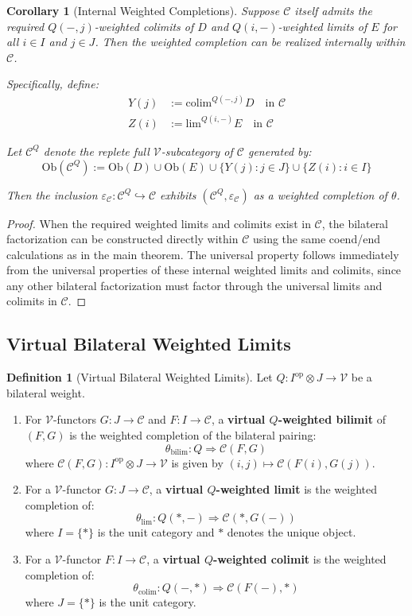 \documentclass[11pt]{article}
\theoremstyle{plain}
\newtheorem{corollary}[theorem]{Corollary}
\theoremstyle{definition}
\newtheorem{definition}[theorem]{Definition}
\theoremstyle{remark}
\newcommand{\V}{\mathcal{V}}
\newcommand{\C}{\mathcal{C}}
\newcommand{\op}{\mathrm{op}}
\newcommand{\colim}{\mathrm{colim}}
\renewcommand{\lim}{\mathrm{lim}}
\begin{document}
\begin{corollary}[Internal Weighted Completions]\label{cor:internal-weighted completion}
Suppose $\C$ itself admits the required $Q(-, j)$-weighted colimits of $D$ and $Q(i, -)$-weighted limits of $E$ for all $i \in I$ and $j \in J$. Then the weighted completion can be realized internally within $\C$.

Specifically, define:
\begin{align}
Y(j) &:= \colim^{Q(-, j)} D \quad \text{in } \C \\
Z(i) &:= \lim^{Q(i, -)} E \quad \text{in } \C
\end{align}

Let $\C^Q$ denote the replete full $\V$-subcategory of $\C$ generated by:
$$\mathrm{Ob}(\C^Q) := \mathrm{Ob}(D) \cup \mathrm{Ob}(E) \cup \{Y(j) : j \in J\} \cup \{Z(i) : i \in I\}$$

Then the inclusion $\varepsilon_\C : \C^Q \hookrightarrow \C$ exhibits $(\C^Q, \varepsilon_\C)$ as a weighted completion of $\theta$.
\end{corollary}

\begin{proof}
When the required weighted limits and colimits exist in $\C$, the bilateral factorization can be constructed directly within $\C$ using the same coend/end calculations as in the main theorem. The universal property follows immediately from the universal properties of these internal weighted limits and colimits, since any other bilateral factorization must factor through the universal limits and colimits in $\C$.
\end{proof}

\subsection{Virtual Bilateral Weighted Limits}

\begin{definition}[Virtual Bilateral Weighted Limits]\label{def:virtual-limits}
Let $Q : I^{\op} \otimes J \to \V$ be a bilateral weight.

\begin{enumerate}
\item For $\V$-functors $G : J \to \C$ and $F : I \to \C$, a \textbf{virtual $Q$-weighted bilimit} of $(F, G)$ is the weighted completion of the bilateral pairing:
$$\theta_{\mathrm{bilim}} : Q \Rightarrow \C(F, G)$$
where $\C(F, G) : I^{\op} \otimes J \to \V$ is given by $(i, j) \mapsto \C(F(i), G(j))$.

\item For a $\V$-functor $G : J \to \C$, a \textbf{virtual $Q$-weighted limit} is the weighted completion of:
$$\theta_{\lim} : Q(\ast, -) \Rightarrow \C(\ast, G(-))$$
where $I = \{\ast\}$ is the unit category and $\ast$ denotes the unique object.

\item For a $\V$-functor $F : I \to \C$, a \textbf{virtual $Q$-weighted colimit} is the weighted completion of:
$$\theta_{\colim} : Q(-, \ast) \Rightarrow \C(F(-), \ast)$$
where $J = \{\ast\}$ is the unit category.
\end{enumerate}
\end{definition}
\end{document}
